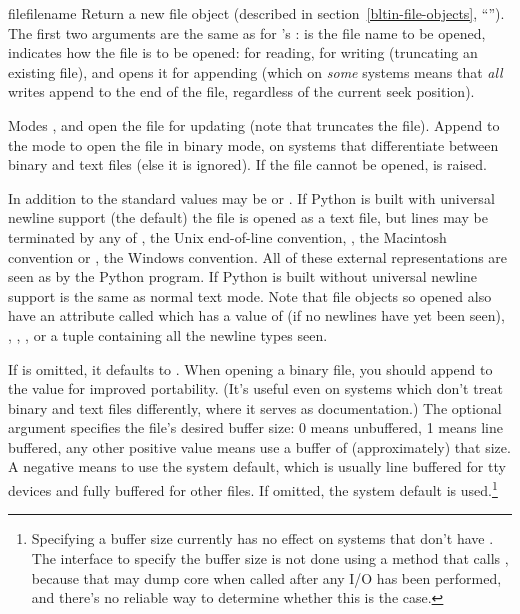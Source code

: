 \begin{funcdesc}{file}{filename}
  Return a new file object (described in
  section~\ref{bltin-file-objects}, ``'').
  The first two arguments are the same as for 's
  :  is the file name to be opened,
   indicates how the file is to be opened:  for
  reading,  for writing (truncating an existing file), and
   opens it for appending (which on \emph{some} \UNIX{}
  systems means that \emph{all} writes append to the end of the file,
  regardless of the current seek position).

  Modes ,  and  open the file for
  updating (note that  truncates the file).  Append
   to the mode to open the file in binary mode, on systems
  that differentiate between binary and text files (else it is
  ignored).  If the file cannot be opened,  is
  raised.

  In addition to the standard  values 
  may be  or . If Python is built with universal
  newline support (the default) the file is opened as a text file, but
  lines may be terminated by any of , the Unix end-of-line
  convention,
  , the Macintosh convention or , the Windows
  convention. All of these external representations are seen as
  by the Python program. If Python is built without universal newline support
    is the same as normal text mode.  Note that
  file objects so opened also have an attribute called
   which has a value of  (if no newlines
  have yet been seen), , , ,
  or a tuple containing all the newline types seen.

  If  is omitted, it defaults to .  When opening a
  binary file, you should append  to the  value
  for improved portability.  (It's useful even on systems which don't
  treat binary and text files differently, where it serves as
  documentation.)
  The optional  argument specifies the
  file's desired buffer size: 0 means unbuffered, 1 means line
  buffered, any other positive value means use a buffer of
  (approximately) that size.  A negative  means to use
  the system default, which is usually line buffered for tty
  devices and fully buffered for other files.  If omitted, the system
  default is used.\footnote{
    Specifying a buffer size currently has no effect on systems that
    don't have .  The interface to specify the
    buffer size is not done using a method that calls
    , because that may dump core when called
    after any I/O has been performed, and there's no reliable way to
    determine whether this is the case.}


\end{funcdesc}
